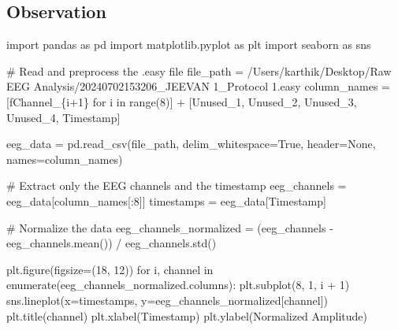 \documentclass[
  11pt,
  letterpaper,
  DIV=11,
  numbers=noendperiod]{scrreprt}
\newenvironment{Shaded}{\begin{snugshade}}{\end{snugshade}}
\newcommand{\BuiltInTok}[1]{\textcolor[rgb]{0.00,0.23,0.31}{#1}}
\newcommand{\CommentTok}[1]{\textcolor[rgb]{0.37,0.37,0.37}{#1}}
\newcommand{\ControlFlowTok}[1]{\textcolor[rgb]{0.00,0.23,0.31}{#1}}
\newcommand{\DecValTok}[1]{\textcolor[rgb]{0.68,0.00,0.00}{#1}}
\newcommand{\ImportTok}[1]{\textcolor[rgb]{0.00,0.46,0.62}{#1}}
\newcommand{\KeywordTok}[1]{\textcolor[rgb]{0.00,0.23,0.31}{#1}}
\newcommand{\NormalTok}[1]{\textcolor[rgb]{0.00,0.23,0.31}{#1}}
\newcommand{\OperatorTok}[1]{\textcolor[rgb]{0.37,0.37,0.37}{#1}}
\newcommand{\SpecialCharTok}[1]{\textcolor[rgb]{0.37,0.37,0.37}{#1}}
\newcommand{\SpecialStringTok}[1]{\textcolor[rgb]{0.13,0.47,0.30}{#1}}
\newcommand{\StringTok}[1]{\textcolor[rgb]{0.13,0.47,0.30}{#1}}
\newcommand{\VariableTok}[1]{\textcolor[rgb]{0.07,0.07,0.07}{#1}}
\begin{document}
\subsection{Observation}\label{observation-4}

\begin{Shaded}
\begin{Highlighting}[]
\ImportTok{import}\NormalTok{ pandas }\ImportTok{as}\NormalTok{ pd}
\ImportTok{import}\NormalTok{ matplotlib.pyplot }\ImportTok{as}\NormalTok{ plt}
\ImportTok{import}\NormalTok{ seaborn }\ImportTok{as}\NormalTok{ sns}

\CommentTok{\# Read and preprocess the .easy file}
\NormalTok{file\_path }\OperatorTok{=} \StringTok{\textquotesingle{}/Users/karthik/Desktop/Raw EEG Analysis/20240702153206\_JEEVAN 1\_Protocol 1.easy\textquotesingle{}}
\NormalTok{column\_names }\OperatorTok{=}\NormalTok{ [}\SpecialStringTok{f\textquotesingle{}Channel\_}\SpecialCharTok{\{}\NormalTok{i}\OperatorTok{+}\DecValTok{1}\SpecialCharTok{\}}\SpecialStringTok{\textquotesingle{}} \ControlFlowTok{for}\NormalTok{ i }\KeywordTok{in} \BuiltInTok{range}\NormalTok{(}\DecValTok{8}\NormalTok{)] }\OperatorTok{+}\NormalTok{ [}\StringTok{\textquotesingle{}Unused\_1\textquotesingle{}}\NormalTok{, }
\StringTok{\textquotesingle{}Unused\_2\textquotesingle{}}\NormalTok{, }\StringTok{\textquotesingle{}Unused\_3\textquotesingle{}}\NormalTok{, }\StringTok{\textquotesingle{}Unused\_4\textquotesingle{}}\NormalTok{, }\StringTok{\textquotesingle{}Timestamp\textquotesingle{}}\NormalTok{]}

\NormalTok{eeg\_data }\OperatorTok{=}\NormalTok{ pd.read\_csv(file\_path, delim\_whitespace}\OperatorTok{=}\VariableTok{True}\NormalTok{, header}\OperatorTok{=}\VariableTok{None}\NormalTok{, }
\NormalTok{names}\OperatorTok{=}\NormalTok{column\_names)}

\CommentTok{\# Extract only the EEG channels and the timestamp}
\NormalTok{eeg\_channels }\OperatorTok{=}\NormalTok{ eeg\_data[column\_names[:}\DecValTok{8}\NormalTok{]]}
\NormalTok{timestamps }\OperatorTok{=}\NormalTok{ eeg\_data[}\StringTok{\textquotesingle{}Timestamp\textquotesingle{}}\NormalTok{]}

\CommentTok{\# Normalize the data}
\NormalTok{eeg\_channels\_normalized }\OperatorTok{=}\NormalTok{ (eeg\_channels }\OperatorTok{{-}}\NormalTok{ eeg\_channels.mean()) }\OperatorTok{/}\NormalTok{ eeg\_channels.std()}

\NormalTok{plt.figure(figsize}\OperatorTok{=}\NormalTok{(}\DecValTok{18}\NormalTok{, }\DecValTok{12}\NormalTok{))}
\ControlFlowTok{for}\NormalTok{ i, channel }\KeywordTok{in} \BuiltInTok{enumerate}\NormalTok{(eeg\_channels\_normalized.columns):}
\NormalTok{    plt.subplot(}\DecValTok{8}\NormalTok{, }\DecValTok{1}\NormalTok{, i }\OperatorTok{+} \DecValTok{1}\NormalTok{)}
\NormalTok{    sns.lineplot(x}\OperatorTok{=}\NormalTok{timestamps, y}\OperatorTok{=}\NormalTok{eeg\_channels\_normalized[channel])}
\NormalTok{    plt.title(channel)}
\NormalTok{    plt.xlabel(}\StringTok{\textquotesingle{}Timestamp\textquotesingle{}}\NormalTok{)}
\NormalTok{    plt.ylabel(}\StringTok{\textquotesingle{}Normalized Amplitude\textquotesingle{}}\NormalTok{)}


\end{Highlighting}
\end{Shaded}
\end{document}
